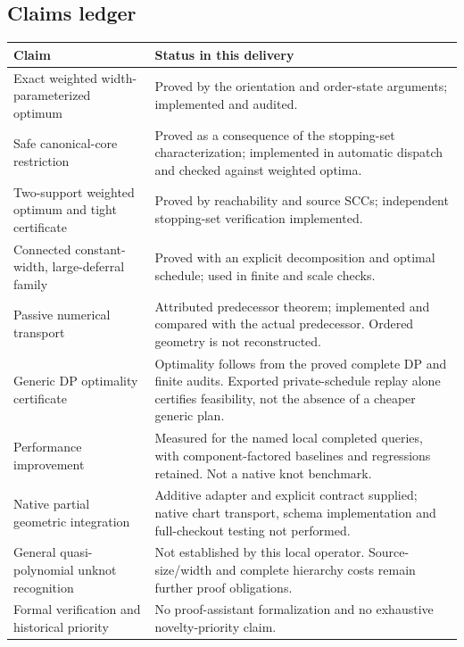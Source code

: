 \documentclass[11pt]{article}
\theoremstyle{definition}\newtheorem{definition}[theorem]{Definition}
\theoremstyle{remark}\newtheorem{remark}[theorem]{Remark}
\begin{document}
\subsection*{Claims ledger}
\begin{longtable}{@{}p{}p{}@{}}
\toprule
Claim & Status in this delivery\\
\midrule
\endhead
Exact weighted width-parameterized optimum & Proved by the orientation and order-state arguments; implemented and audited.\\[5pt]
Safe canonical-core restriction & Proved as a consequence of the stopping-set characterization; implemented in automatic dispatch and checked against weighted optima.\\[5pt]
Two-support weighted optimum and tight certificate & Proved by reachability and source SCCs; independent stopping-set verification implemented.\\[5pt]
Connected constant-width, large-deferral family & Proved with an explicit decomposition and optimal schedule; used in finite and scale checks.\\[5pt]
Passive numerical transport & Attributed predecessor theorem; implemented and compared with the actual predecessor. Ordered geometry is not reconstructed.\\[5pt]
Generic DP optimality certificate & Optimality follows from the proved complete DP and finite audits. Exported private-schedule replay alone certifies feasibility, not the absence of a cheaper generic plan.\\[5pt]
Performance improvement & Measured for the named local completed queries, with component-factored baselines and regressions retained. Not a native knot benchmark.\\[5pt]
Native partial geometric integration & Additive adapter and explicit contract supplied; native chart transport, schema implementation and full-checkout testing not performed.\\[5pt]
General quasi-polynomial unknot recognition & Not established by this local operator. Source-size/width and complete hierarchy costs remain further proof obligations.\\[5pt]
Formal verification and historical priority & No proof-assistant formalization and no exhaustive novelty-priority claim.\\
\bottomrule
\end{longtable}
\end{document}
